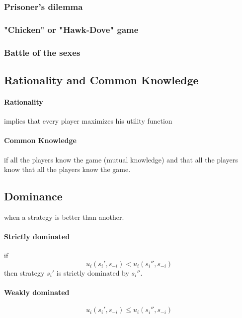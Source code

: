 \documentclass[a4paper] {scrartcl}
\begin{document}
\subsubsection{Prisoner's dilemma}
\subsubsection{"Chicken" or "Hawk-Dove" game}
\subsubsection{Battle of the sexes}

\subsection{Rationality and Common Knowledge}
\paragraph{Rationality} %
\label{par:rationality}
implies that every player maximizes his utility function

\paragraph{Common Knowledge} %
\label{par:common_knowledge}
if all the players know the game (mutual knowledge) and that all the players know that all the players know the game.


\subsection{Dominance} 
when a strategy is better than another.

\paragraph{Strictly dominated} %
\label{par:strictly_dominated}
if
\begin{equation}
	u_i(s_i', s_{-i})<u_i(s_i'', s_{-i})
\end{equation}
then strategy $s_i'$ is strictly dominated by $s_i''$.

\paragraph{Weakly dominated} %
\label{par:weakly_dominate}
\begin{equation}
	u_i(s_i', s_{-i})\leq u_i(s_i'', s_{-i})
\end{equation}
\end{document}
